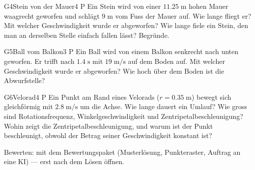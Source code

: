 \documentclass[11pt]{article}
\begin{document}

\begin{lpaufgabe}{G4}{Stein von der Mauer}{4 P}
Ein Stein wird von einer $11.25\;\text{m}$ hohen Mauer waagrecht geworfen und schlägt $9\;\text{m}$ vom Fuss der Mauer auf.
Wie lange fliegt er? Mit welcher Geschwindigkeit wurde er abgeworfen?
Wie lange fiele ein Stein, den man an derselben Stelle einfach fallen lässt? Begründe.
\end{lpaufgabe}

\begin{lpaufgabe}{G5}{Ball vom Balkon}{3 P}
Ein Ball wird von einem Balkon senkrecht nach unten geworfen. Er trifft nach $1.4\;\text{s}$ mit $19\;\text{m/s}$ auf dem Boden auf.
Mit welcher Geschwindigkeit wurde er abgeworfen? Wie hoch über dem Boden ist die Abwurfstelle?
\end{lpaufgabe}


\begin{lpaufgabe}{G6}{Velorad}{4 P}
Ein Punkt am Rand eines Velorads ($r = 0.35\;\text{m}$) bewegt sich gleichförmig mit $2.8\;\text{m/s}$ um die Achse.
Wie lange dauert ein Umlauf? Wie gross sind Rotationsfrequenz, Winkelgeschwindigkeit und Zentripetalbeschleunigung?
Wohin zeigt die Zentripetalbeschleunigung, und warum ist der Punkt beschleunigt, obwohl der Betrag seiner Geschwindigkeit konstant ist?
\end{lpaufgabe}

\vfill
{\small\color{lpgrau}Bewerten: mit dem Bewertungspaket (Musterlösung, Punkteraster, Auftrag an eine KI) — erst nach dem Lösen öffnen.}
\end{document}
